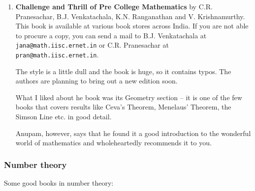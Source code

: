 \documentclass[a4paper]{amsart}
\begin{document}
\begin{enumerate}
\item {\bf Challenge and Thrill of Pre College Mathematics} by C.R. Pranesachar, B.J. Venkatachala, K.N. Ranganathan 
  and V. Krishnamurthy. This book is available at various book stores across India. 
  If you are not able to procure a copy, you can send a mail to 
  B.J. Venkatachala at {\tt jana@math.iisc.ernet.in} or C.R. Pranesachar at {\tt pran@math.iisc.ernet.in}.

  The style is a little dull and the book is huge, so it contains typos. The authors are planning to bring out a new
  edition soon.

  What I liked about he book was its Geometry section -- it is one of the few books that covers results like Ceva's Theorem,
  Menelaus' Theorem, the Simson Line etc. in good detail.

  Anupam, however, says that he found it a good introduction to the wonderful world of mathematics and wholeheartedly recommends it to
  you.
\end{enumerate}

\subsubsection{Number theory}

Some good books in number theory:
\end{document}

